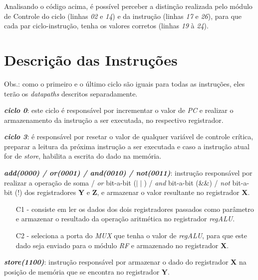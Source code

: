 \documentclass[12pt, a4paper]{article}
\begin{document}
	\par Analisando o código acima, é possível perceber a distinção realizada pelo módulo de Controle do ciclo (linhas \textit{02} e \textit{14}) e da instrução (linhas \textit{17} e \textit{26}), para que cada par ciclo-instrução, tenha os valores corretos (linhas \textit{19} à \textit{24}).
	
	\section{Descrição das Instruções}
	
	Obs.: como o primeiro e o último ciclo são iguais para todas as instruções, eles terão os \textit{datapaths} descritos separadamente. \newline
	
	\par \textit{\textbf{ciclo 0}}: este ciclo é responsável por incrementar o valor de \textit{PC} e realizar o armazenamento da instrução a ser executada, no respectivo registrador. \newline
	
	\par \textit{\textbf{ciclo 3}}: é responsável por resetar o valor de qualquer variável de controle crítica, preparar a leitura da próxima instrução a ser executada e caso a instrução atual for de \textit{store}, habilita a escrita do dado na memória. \newline
	
	\par \textit{\textbf{add(0000) / or(0001) / and(0010) / not(0011)}}: instrução responsável por realizar a operação de  soma / \textit{or} bit-a-bit ($\mid\mid$) / \textit{and} bit-a-bit (\&\&) / \textit{not} bit-a-bit (!) dos registradores \textbf{Y} e \textbf{Z}, e armazenar o valor resultante no registrador \textbf{X}.
	
	\begin{enumerate}
	   	\item[C1 -] consiste em ler os dados dos dois registradores passados como parâmetro e armazenar o resultado da operação aritmética no registrador \textit{regALU}.
	   	
	   	\item[C2 -] seleciona a porta do \textit{MUX} que tenha o valor de \textit{regALU}, para que este dado seja enviado para o módulo \textit{RF} e armazenado no registrador \textbf{X}.
	\end{enumerate}
	
	\par \textit{\textbf{store(1100)}}: instrução responsável por armazenar o dado do registrador \textbf{X} na posição de memória que se encontra no registrador \textbf{Y}.
	
\end{document}
